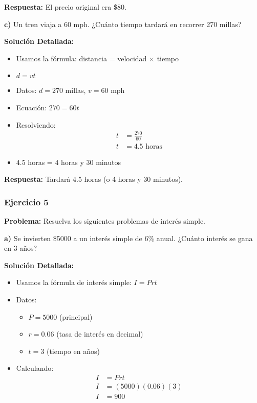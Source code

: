 \textbf{Respuesta:} El precio original era \$80.

\medskip

\textbf{c)} Un tren viaja a 60 mph. ¿Cuánto tiempo tardará en recorrer 270 millas?

\textbf{Solución Detallada:}
\begin{itemize}
    \item Usamos la fórmula: distancia = velocidad $\times$ tiempo
    \item $d = vt$
    \item Datos: $d = 270$ millas, $v = 60$ mph
    \item Ecuación: $270 = 60t$
    \item Resolviendo:
    \begin{align*}
    t &= \frac{270}{60} \\
    t &= 4.5 \text{ horas}
    \end{align*}
    \item $4.5$ horas = $4$ horas y $30$ minutos
\end{itemize}

\textbf{Respuesta:} Tardará 4.5 horas (o 4 horas y 30 minutos).

\hrulefill


\subsubsection*{Ejercicio 5}
\textbf{Problema:} Resuelva los siguientes problemas de interés simple.

\medskip

\textbf{a)} Se invierten \$5000 a un interés simple de 6\% anual. ¿Cuánto interés se gana en 3 años?

\textbf{Solución Detallada:}
\begin{itemize}
    \item Usamos la fórmula de interés simple: $I = Prt$
    \item Datos:
    \begin{itemize}
        \item $P = 5000$ (principal)
        \item $r = 0.06$ (tasa de interés en decimal)
        \item $t = 3$ (tiempo en años)
    \end{itemize}
    \item Calculando:
    \begin{align*}
    I &= Prt \\
    I &= (5000)(0.06)(3) \\
    I &= 900
    \end{align*}
\end{itemize}

